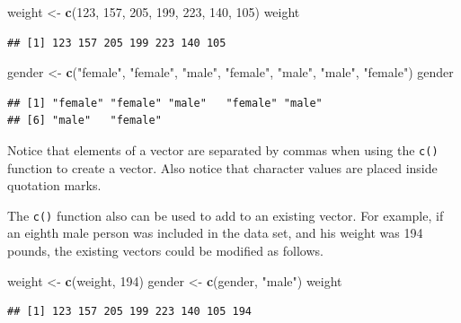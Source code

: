 \documentclass[
]{krantz}
\newenvironment{Shaded}{\begin{snugshade}}{\end{snugshade}}
\newcommand{\DecValTok}[1]{\textcolor[rgb]{0.00,0.00,0.81}{#1}}
\newcommand{\KeywordTok}[1]{\textcolor[rgb]{0.13,0.29,0.53}{\textbf{#1}}}
\newcommand{\NormalTok}[1]{#1}
\newcommand{\StringTok}[1]{\textcolor[rgb]{0.31,0.60,0.02}{#1}}
\begin{document}
\begin{Shaded}
\begin{Highlighting}[]
\NormalTok{weight \textless{}{-}}\StringTok{ }\KeywordTok{c}\NormalTok{(}\DecValTok{123}\NormalTok{, }\DecValTok{157}\NormalTok{, }\DecValTok{205}\NormalTok{, }\DecValTok{199}\NormalTok{, }\DecValTok{223}\NormalTok{, }\DecValTok{140}\NormalTok{, }\DecValTok{105}\NormalTok{)}
\NormalTok{weight}
\end{Highlighting}
\end{Shaded}

\begin{verbatim}
## [1] 123 157 205 199 223 140 105
\end{verbatim}

\begin{Shaded}
\begin{Highlighting}[]
\NormalTok{gender \textless{}{-}}\StringTok{ }\KeywordTok{c}\NormalTok{(}\StringTok{"female"}\NormalTok{, }\StringTok{"female"}\NormalTok{, }\StringTok{"male"}\NormalTok{, }\StringTok{"female"}\NormalTok{, }\StringTok{"male"}\NormalTok{,}
            \StringTok{"male"}\NormalTok{, }\StringTok{"female"}\NormalTok{)}
\NormalTok{gender}
\end{Highlighting}
\end{Shaded}

\begin{verbatim}
## [1] "female" "female" "male"   "female" "male"  
## [6] "male"   "female"
\end{verbatim}

Notice that elements of a vector are separated by commas when using the \texttt{c()} function to create a vector. Also notice that character values are placed inside quotation marks.

The \texttt{c()} function also can be used to add to an existing vector. For example, if an eighth male person was included in the data set, and his weight was 194 pounds, the existing vectors could be modified as follows.

\begin{Shaded}
\begin{Highlighting}[]
\NormalTok{weight \textless{}{-}}\StringTok{ }\KeywordTok{c}\NormalTok{(weight, }\DecValTok{194}\NormalTok{)}
\NormalTok{gender \textless{}{-}}\StringTok{ }\KeywordTok{c}\NormalTok{(gender, }\StringTok{"male"}\NormalTok{)}
\NormalTok{weight}
\end{Highlighting}
\end{Shaded}

\begin{verbatim}
## [1] 123 157 205 199 223 140 105 194
\end{verbatim}
\end{document}
